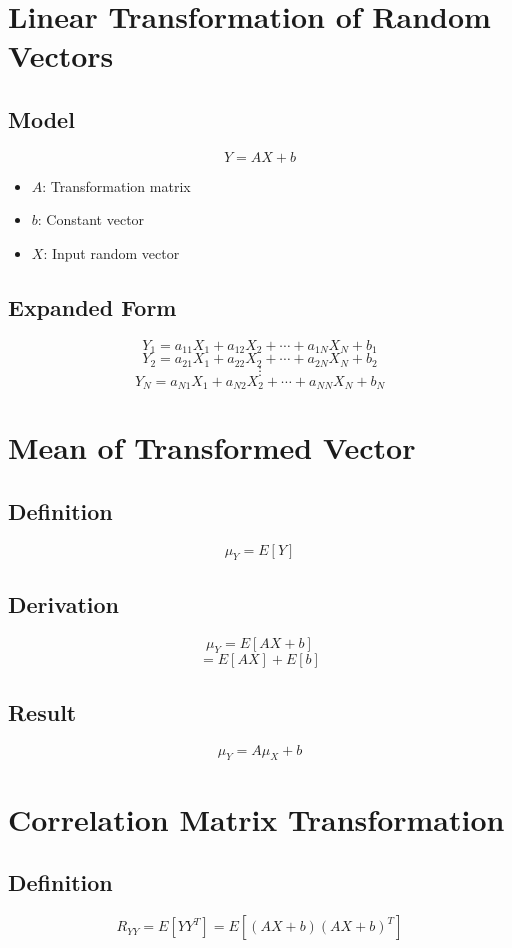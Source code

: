 \documentclass[11pt]{article}
\begin{document}
\section{Linear Transformation of Random Vectors}

\subsection{Model}
\[
Y = AX + b
\]

\begin{itemize}
\item $A$: Transformation matrix
\item $b$: Constant vector
\item $X$: Input random vector
\end{itemize}

\subsection{Expanded Form}
\[
Y_1 = a_{11}X_1 + a_{12}X_2 + \cdots + a_{1N}X_N + b_1
\]
\[
Y_2 = a_{21}X_1 + a_{22}X_2 + \cdots + a_{2N}X_N + b_2
\]
\[
\vdots
\]
\[
Y_N = a_{N1}X_1 + a_{N2}X_2 + \cdots + a_{NN}X_N + b_N
\]

\section{Mean of Transformed Vector}

\subsection{Definition}
\[
\mu_Y = E[Y]
\]

\subsection{Derivation}
\[
\mu_Y = E[AX + b]
\]
\[
= E[AX] + E[b]
\]

\subsection{Result}
\[
\mu_Y = A\mu_X + b
\]

\section{Correlation Matrix Transformation}

\subsection{Definition}
\[
R_{YY} = E[YY^T] = E[(AX + b)(AX + b)^T]
\]
\end{document}
